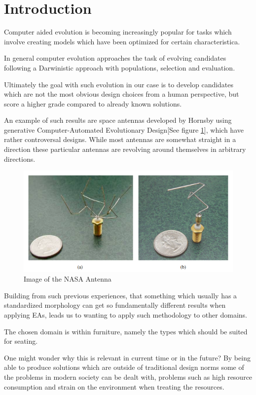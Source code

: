 \section{Introduction}
Computer aided evolution is becoming increasingly popular for tasks which involve creating models which have been optimized for certain characteristica.

In general computer evolution approaches the task of evolving candidates following a Darwinistic approach with populations, selection and evaluation\cite{paper:ev3}.

Ultimately the goal with such evolution in our case is to develop candidates which are not the most obvious design choices from a human perspective, but score a higher grade compared to already known solutions.

An example of such results are space antennas developed by Hornsby\cite{paper:ev4} using generative Computer-Automated Evolutionary Design[See figure \ref{fig:nasa_antenna}], which have rather controversal designs. While most antennas are somewhat straight in a direction these particular antennas are revolving around themselves in arbitrary directions.

\begin{figure}[ht]
\includegraphics[scale=.7]{content/img/space_antenna}
\caption{Image of the NASA Antenna \cite{paper:ev4} }
\label{fig:nasa_antenna}
\end{figure}

Building from such previous experiences, that something which usually has a standardized morphology can get so fundamentally different results when applying EAs, leads us to wanting to apply such methodology to other domains.

The chosen domain is within furniture, namely the types which should be suited for seating.

One might wonder why this is relevant in current time or in the future?
By being able to produce solutions which are outside of traditional design norms some of the problems in modern society can be dealt with, problems such as high resource consumption and strain on the environment when treating the resources.


